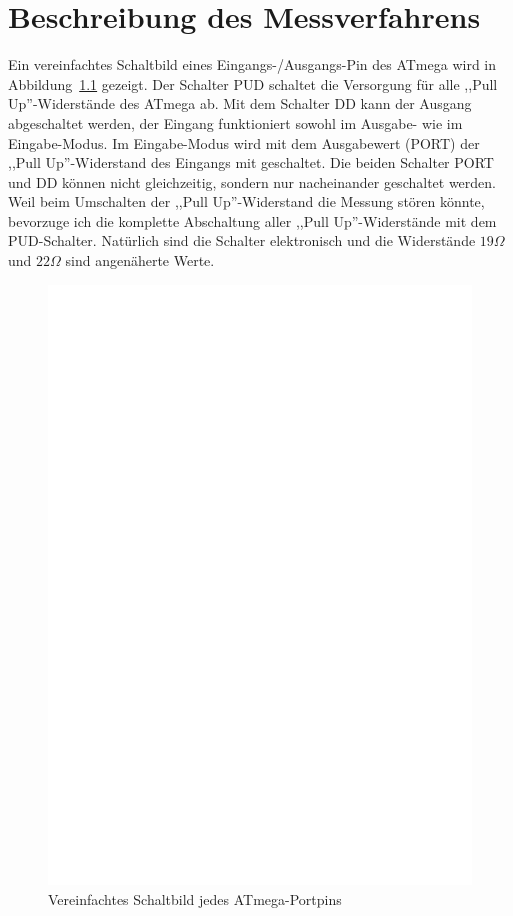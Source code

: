 \chapter{Beschreibung des Messverfahrens}
\label{sec:measurement}
Ein vereinfachtes Schaltbild eines Eingangs-/Ausgangs-Pin des ATmega wird in Abbildung~\ref{fig:port} gezeigt.
Der Schalter PUD schaltet die Versorgung für alle ,,Pull Up''-Widerstände des ATmega ab.
Mit dem Schalter DD kann der Ausgang abgeschaltet werden, der Eingang funktioniert sowohl im Ausgabe- wie im
Eingabe-Modus. Im Eingabe-Modus wird mit dem Ausgabewert (PORT) der ,,Pull Up''-Widerstand des Eingangs mit geschaltet.
Die beiden Schalter PORT und DD können nicht gleichzeitig, sondern nur nacheinander geschaltet werden.
Weil beim Umschalten der ,,Pull Up''-Widerstand die Messung stören könnte, bevorzuge ich die komplette
Abschaltung aller ,,Pull Up''-Widerstände mit dem PUD-Schalter.
Natürlich sind die Schalter elektronisch und die Widerstände \(19\Omega\) und \(22\Omega\) sind angenäherte Werte.
\begin{figure}[H]
\centering
\includegraphics[]{../FIG/port.eps}
\caption{Vereinfachtes Schaltbild jedes ATmega-Portpins}
\label{fig:port}
\end{figure}

